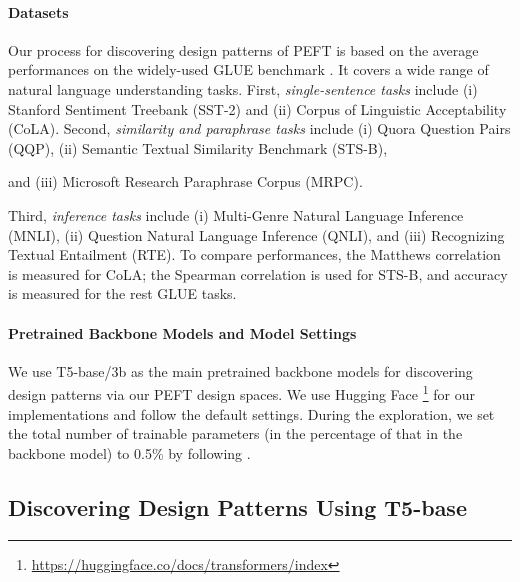 \paragraph{Datasets} Our process for discovering design patterns of PEFT is based on the average performances on the widely-used GLUE benchmark \citep{Wang2018GLUEAM}.  It covers a wide range of natural language understanding tasks. First,
\textit{single-sentence tasks} include (i) Stanford Sentiment Treebank (SST-2) and (ii) Corpus of Linguistic Acceptability (CoLA). Second,
\textit{similarity and paraphrase tasks} include (i) Quora Question Pairs (QQP), (ii) Semantic Textual Similarity Benchmark (STS-B), 

and (iii) Microsoft Research Paraphrase Corpus (MRPC).

Third,
\textit{inference tasks} include (i) Multi-Genre Natural Language Inference (MNLI), (ii)  Question Natural Language Inference (QNLI), and (iii) Recognizing Textual Entailment (RTE). To compare performances, the Matthews correlation is measured for CoLA; the Spearman correlation is used for STS-B, and accuracy is measured for the rest GLUE tasks.

\paragraph{Pretrained Backbone Models and Model Settings}  We use T5-base/3b \citep{raffel2020exploring} as the main pretrained backbone models for discovering design patterns via our PEFT design spaces. We use Hugging Face \footnote{\url{https://huggingface.co/docs/transformers/index}} for our implementations and follow the default settings. During the exploration, we set the total number of trainable parameters (in the percentage of that in the backbone model) to 0.5\% by following \citet{https://doi.org/10.48550/arxiv.2110.04366}.

\subsection{Discovering Design Patterns Using T5-base}

